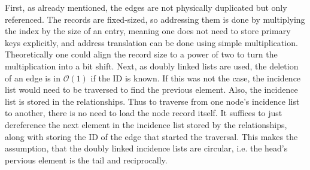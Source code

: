         First, as already mentioned, the edges are not physically duplicated but only referenced. 
        The records are fixed-sized, so addressing them is done by multiplying the index by the size of an entry, meaning one does not need to store primary keys explicitly, and address translation can be done using simple multiplication. 
        Theoretically one could align the record size to a power of two to turn the multiplication into a bit shift.
        Next, as doubly linked lists are used, the deletion of an edge is in $\mathcal{O}(1)$ if the ID is known.
        If this was not the case, the incidence list would need to be traversed to find the previous element.
        Also, the incidence list is stored in the relationships.
        Thus to traverse from one node's incidence list to another, there is no need to load the node record itself.
        It suffices to just dereference the next element in the incidence list stored by the relationships, along with storing the ID of the edge that started the traversal.
        This makes the assumption, that the doubly linked incidence lists are circular, i.e. the head's pervious element is the tail and reciprocally.

